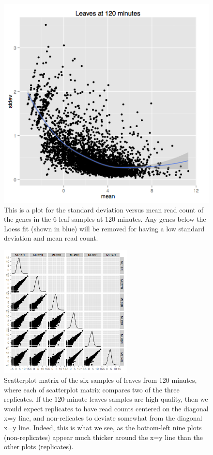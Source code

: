 \documentclass[11pt,a4paper,oldfontcommands,openany]{memoir}
\numberwithin{equation}{section} %
\begin{document}
\begin{figure}[H]
    \centering
    \includegraphics[width=\textwidth]{loessL120}
    \caption{This is a plot for the standard deviation versus mean read count of the genes in the 6 leaf samples at 120 minutes. Any genes below the Loess fit (shown in blue) will be removed for having a low standard deviation and mean read count.}
    \label{fig:loess}
\end{figure}

\begin{figure}[H]
    \centering
    \includegraphics[width=0.6\textwidth]{L120scatter}
    \caption{Scatterplot matrix of the six samples of leaves from 120 minutes, where each of scatterplot matrix compares two of the three replicates. If the 120-minute leaves samples are high quality, then we would expect replicates to have read counts centered on the diagonal x=y line, and non-relicates to deviate somewhat from the diagonal x=y line. Indeed, this is what we see, as the bottom-left nine plots (non-replicates) appear much thicker around the x=y line than the other plots (replicates).}
    \label{fig:L120scatter}
\end{figure}
\end{document}
